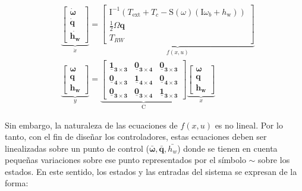 \begin{equation}\label{eq:espacio_estados_non}
	\begin{aligned}
		& \underbrace{\left[\begin{array}{c}
				\dot{\boldsymbol{\omega}} \\
				\dot{\boldsymbol{q}} \\
				\dot{\boldsymbol{h_{w}}}
			\end{array}\right]}_{\dot{x}}=\underbrace{\left[\begin{array}{c}
				{\mathrm{I}}^{-1}\left(T_{\mathrm{ext}}+T_{c}-{\mathrm{S}}(\omega)\left({\mathrm{I}} \omega_{b}+h_{\mathrm{w}}\right)\right) \\
				\frac{1}{2} {\Omega} \boldsymbol{q} \\
				T_{RW}
			\end{array}\right]}_{f(x,u)}\\[10pt]
		& \underbrace{\left[\begin{array}{c}
				\boldsymbol{\omega} \\
				\boldsymbol{q} \\
				\boldsymbol{h_{w}}
			\end{array}\right]}_y=\underbrace{\left[\begin{array}{ccc}
				\boldsymbol{\underline{1}_{3 \times 3}} & \boldsymbol{\underline{0}_{3 \times 4}} & \boldsymbol{\underline{0}_{3 \times 3}}\\
				\boldsymbol{\underline{0}_{4 \times 3}} & \boldsymbol{\underline{1}_{4 \times 4}} & \boldsymbol{\underline{0}_{4 \times 3}} \\
				\boldsymbol{\underline{0}_{3 \times 3}} & \boldsymbol{\underline{0}_{3 \times 4}} & \boldsymbol{\underline{1}_{3 \times 3}}
			\end{array}\right]}_{{\mathrm{C}}} \underbrace{\left[\begin{array}{c}
				\boldsymbol{\omega}\\
				\boldsymbol{q} \\
				\boldsymbol{h_{w}}
			\end{array}\right]}_x
	\end{aligned}	
\end{equation}

Sin embargo, la naturaleza de las ecuaciones de $f(x,u)$ es no lineal. Por lo tanto, con el fin de diseñar los controladores, estas ecuaciones deben ser linealizadas sobre un punto de control ($\boldsymbol{\bar{\omega}},\boldsymbol{\bar{q}},\bar{h_w}$) donde se tienen en cuenta pequeñas variaciones sobre ese punto representados por el símbolo $\sim$ sobre los estados. En este sentido, los estados y las entradas del sistema se expresan de la forma: 

